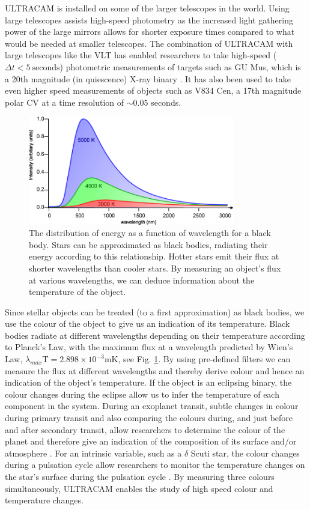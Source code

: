 ULTRACAM is installed on some of the larger telescopes in the world. Using large telescopes assists high-speed photometry as the increased light gathering power of the large mirrors allows for shorter exposure times compared to what would be needed at smaller telescopes. The combination of ULTRACAM with large telescopes like the VLT has enabled researchers to take high-speed ($\Delta t<5~\mbox{seconds}$) photometric measurements of targets such as GU Mus, which is a 20th magnitude (in quiescence) X-ray binary \citep{tariq2010}. It has also been used to take even higher speed measurements of objects such as V834 Cen, a 17th magnitude polar CV at a time resolution of $\sim 0.05$ seconds.

\begin{figure}
\centering
\includegraphics[width=90mm]{images/wienslaw.png}
\caption[Caption for LOF]{The distribution of energy as a function of wavelength for a black body\protect\footnotemark. Stars can be approximated as black bodies, radiating their energy according to this relationship. Hotter stars emit their flux at shorter wavelengths than cooler stars. By measuring an object's flux at various wavelengths, we can deduce information about the temperature of the object.}
\label{fig:wienslaw}
\end{figure}
Since stellar objects can be treated (to a first approximation) as black bodies, we use the colour of the object to give us an indication of its temperature. Black bodies radiate at different wavelengths depending on their temperature according to Planck's Law, with the maximum flux at a wavelength predicted by Wien's Law, $\lambda_{max}\mbox{T} = 2.898\times10^{-3}\mbox{mK}$, see Fig. \ref{fig:wienslaw}. By using pre-defined filters we can measure the flux at different wavelengths and thereby derive colour and hence an indication of the object's temperature. If the object is an eclipsing binary, the colour changes during the eclipse allow us to infer the temperature of each component in the system. During an exoplanet transit, subtle changes in colour during primary transit and also comparing the colours during, and just before and after secondary transit, allow researchers to determine the colour of the planet and therefore give an indication of the composition of its surface and/or atmosphere \citep{2012ApJS..201...36B}. For an intrinsic variable, such as a $\delta$ Scuti star, the colour changes during a pulsation cycle allow researchers to monitor the temperature changes on the star's surface during the pulsation cycle \citep{KurtzBook}. By measuring three colours simultaneously, ULTRACAM enables the study of high speed colour and temperature changes. 

